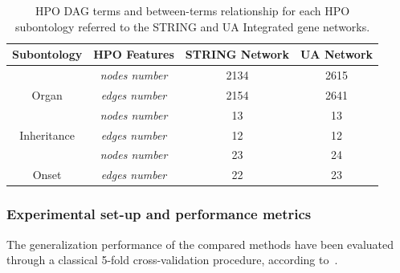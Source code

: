 \documentclass{bioinfo}
\begin{document}


\begin{table}[!ht]
\centering
\caption{HPO DAG terms and between-terms relationship for each HPO subontology referred to the STRING and UA Integrated gene networks.}
\vskip 0.05in
\begin{tabular}{|c|c|c|c|} 
\hline
{\bf Subontology} & {\bf HPO Features} &  {\bf STRING Network} &  {\bf UA Network}\\ \hline
\cellcolor{white} & {\it nodes number } & 2134 & 2615\\ 
\multirow{-2}{*}{\cellcolor{white} Organ} & {\it edges number}  & 2154 & 2641\\ \hline
%
\cellcolor{white} & {\it nodes number} & 13 & 13\\ 
\multirow{-2}{*}{\cellcolor{white} Inheritance} & {\it edges number}  & 12 & 12 \\ \hline
%
\cellcolor{white} & {\it nodes number} & 23  & 24\\ 
\multirow{-2}{*}{\cellcolor{white} Onset} & {\it edges number}  & 22  & 23\\ \hline
\end{tabular} 
\vskip -0.1in
\label{hpostat}
\end{table}


\subsubsection{Experimental set-up and performance metrics}
\label{eval}
The generalization performance of the compared methods have been evaluated through a classical 5-fold cross-validation procedure, according to~\citet{PHENO15}.
\end{document}
